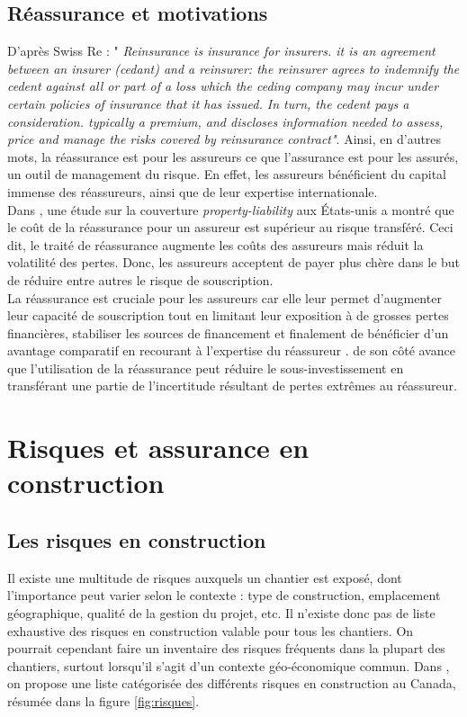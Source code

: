 \documentclass[11pt]{article}
\begin{document}
\subsection{Réassurance et motivations}
D’après Swiss Re \cite{swissre}: "\textit{
Reinsurance is insurance for insurers. it is an agreement between an insurer (cedant) and a reinsurer: the reinsurer agrees to indemnify the cedent against all or part of  a loss which the ceding company may incur under certain policies of insurance that it has issued. In turn, the cedent pays a consideration. typically a premium, and discloses information needed to assess, price and manage the risks covered by reinsurance contract"}. Ainsi, en d’autres mots, la réassurance est pour les assureurs ce que l’assurance est pour les assurés, un outil de management du risque. En effet, les assureurs bénéficient du capital immense des réassureurs, ainsi que de leur expertise internationale.\\
Dans \cite{cummins}, une étude sur la couverture \textit{property-liability} aux États-unis a montré que le coût de la réassurance pour un assureur est supérieur au risque transféré. Ceci dit, le traité de réassurance augmente les coûts des assureurs mais réduit la volatilité des pertes. Donc, les assureurs acceptent de payer plus chère dans le but de réduire entre autres le risque de souscription.\\
La réassurance est cruciale pour les assureurs car elle leur permet d’augmenter leur capacité de souscription tout en limitant leur exposition à de grosses pertes financières, stabiliser les sources de financement et finalement de bénéficier d’un avantage comparatif en recourant à l’expertise du réassureur \cite{cole} \cite{powell}. \cite{myers} de son côté avance que l’utilisation de la réassurance peut réduire le sous-investissement en transférant une partie de l’incertitude résultant de pertes extrêmes au réassureur. 

\section{Risques et assurance en construction}

\subsection{Les risques en construction}


Il existe une multitude de risques auxquels un chantier est exposé, dont l'importance peut varier selon le contexte : type de construction, emplacement géographique, qualité de la gestion du projet, etc. Il n'existe donc pas de liste exhaustive des risques en construction valable pour tous les chantiers. On pourrait cependant faire un inventaire des risques fréquents dans la plupart des chantiers, surtout lorsqu'il s'agit d'un contexte géo-économique commun. Dans \cite{Marsh}, on propose une liste catégorisée des différents risques en construction au Canada, résumée dans la figure \ref{fig:risques}.
\end{document}
